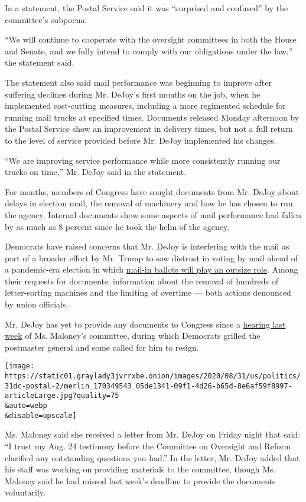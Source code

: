 In a statement, the Postal Service said it was ``surprised and
confused'' by the committee's subpoena.

``We will continue to cooperate with the oversight committees in both
the House and Senate, and we fully intend to comply with our obligations
under the law,'' the statement said.

The statement also said mail performance was beginning to improve after
suffering declines during Mr. DeJoy's first months on the job, when he
implemented cost-cutting measures, including a more regimented schedule
for running mail trucks at specified times. Documents released Monday
afternoon by the Postal Service show an improvement in delivery times,
but not a full return to the level of service provided before Mr. DeJoy
implemented his changes.

``We are improving service performance while more consistently running
our trucks on time,'' Mr. DeJoy said in the statement.

For months, members of Congress have sought documents from Mr. DeJoy
about delays in election mail, the removal of machinery and how he has
chosen to run the agency. Internal documents show some aspects of mail
performance had fallen by as much as 8 percent since he took the helm of
the agency.

Democrats have raised concerns that Mr. DeJoy is interfering with the
mail as part of a broader effort by Mr. Trump to sow distrust in voting
by mail ahead of a pandemic-era election in which
\href{https://www.nytimes3xbfgragh.onion/interactive/2020/08/11/us/politics/vote-by-mail-us-states.html}{mail-in
ballots will play an outsize role}. Among their requests for documents:
information about the removal of hundreds of letter-sorting machines and
the limiting of overtime --- both actions denounced by union officials.

Mr. DeJoy has yet to provide any documents to Congress since a
\href{https://www.nytimes3xbfgragh.onion/2020/08/24/us/politics/louis-dejoy-post-office-hearing.html}{hearing
last week} of Ms. Maloney's committee, during which Democrats grilled
the postmaster general and some called for him to resign.

\texttt{[image: https://static01.graylady3jvrrxbe.onion/images/2020/08/31/us/politics/31dc-postal-2/merlin\_170349543\_05de1341-09f1-4d26-b65d-8e6af59f8997-articleLarge.jpg?quality=75\\\&auto=webp\\\&disable=upscale]}

Ms. Maloney said she received a letter from Mr. DeJoy on Friday night
that said: ``I trust my Aug. 24 testimony before the Committee on
Oversight and Reform clarified any outstanding questions you had.'' In
the letter, Mr. DeJoy added that his staff was working on providing
materials to the committee, though Ms. Maloney said he had missed last
week's deadline to provide the documents voluntarily.

